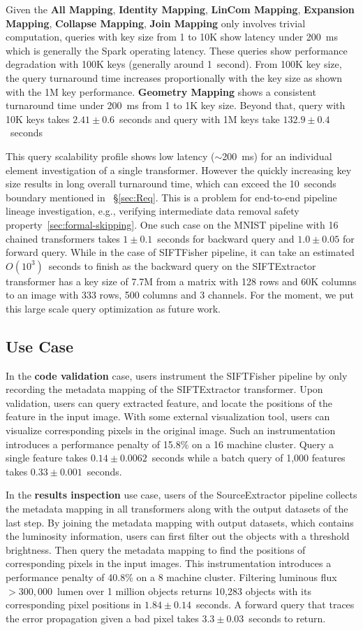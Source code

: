 \documentclass{sig-alternate}
\begin{document}
Given the {\bf All Mapping}, {\bf Identity Mapping}, {\bf LinCom Mapping}, {\bf Expansion Mapping}, {\bf Collapse Mapping}, {\bf Join Mapping}
only involves trivial computation, queries with key size from 1 to 10K show latency under 200~ms which is generally the Spark operating latency. 
These queries show performance degradation with 100K keys (generally around 1~second). 
From 100K key size, the query turnaround time increases proportionally with the key size as shown with the 1M key performance.
{\bf Geometry Mapping} shows a consistent turnaround time under 200~ms from 1 to 1K key size. 
Beyond that, query with 10K keys takes $2.41\pm0.6$~seconds and query with 1M keys take $132.9\pm0.4$~seconds

This query scalability profile shows low latency ($\sim$200~ms) for an individual element investigation of a single transformer. 
However the quickly increasing key size results in long overall turnaround time, which can exceed the 10~seconds boundary mentioned in ~\S\ref{sec:Req}. 
This is a problem for end-to-end pipeline lineage investigation, e.g., verifying intermediate data removal safety property~\ref{sec:formal-skipping}.
One such case on the MNIST pipeline with 16 chained transformers takes $1\pm0.1$~seconds for backward query and $1.0\pm 0.05$ for forward query.
While in the case of SIFTFisher pipeline,  it can take an estimated $O(10^3)$~seconds to finish as the backward query on the SIFTExtractor
transformer has a key size of 7.7M from a matrix with 128 rows and 60K columns to an image with 333 rows, 500 columns and 3 channels. 
For the moment, we put this large scale query optimization as future work.

\subsection{Use Case}
In the {\bf code validation} case, users instrument the SIFTFisher pipeline by only recording the metadata mapping of the SIFTExtractor transformer.
Upon validation, users can query extracted feature, and locate the positions of the feature in the input image. With some external visualization tool,
users can visualize corresponding pixels in the original image. Such an instrumentation introduces a performance penalty of 15.8\% on a 16 machine 
cluster.
Query a single feature takes $0.14\pm0.0062$~seconds while a batch query of 1,000 features takes $0.33\pm0.001$~seconds.

In the {\bf results inspection} use case, users of the SourceExtractor pipeline collects the metadata mapping in all transformers along with the output 
datasets of the last step. By joining the metadata mapping with output datasets, which contains the luminosity information, users can first filter out the
objects with a threshold brightness. Then query the metadata mapping to find the positions of corresponding pixels in the input images.
This instrumentation introduces a performance penalty of 40.8\% on a 8 machine cluster. 
Filtering luminous flux $>300,000$~lumen over 1 million objects returns 10,283 objects
with its corresponding pixel positions in $1.84\pm0.14$~seconds. 
A forward query that traces the error propagation given a bad pixel takes $3.3\pm0.03$~seconds to return.
\end{document}
